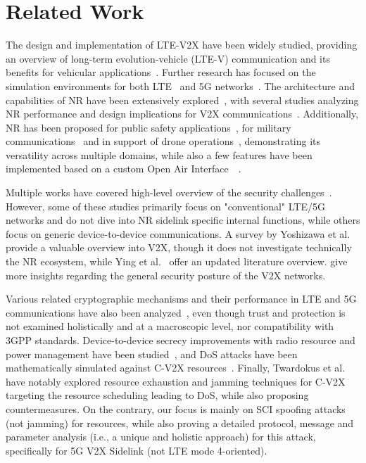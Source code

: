 \section{Related Work}
\label{sec:related-work}

The design and implementation of LTE-V2X have been widely studied, providing an overview of long-term evolution-vehicle (LTE-V) communication and its benefits for vehicular applications~\cite{Molina17LTEVFS, bazzi21V2X, liu15cellular, Chen17v2x, Asadi14survey}. Further research has focused on the simulation environments for both LTE~\cite{Virdis16simu} and 5G networks~\cite{Liu22nr}. The architecture and capabilities of NR have been extensively explored~\cite{Garcia21tutorial}, with several studies analyzing NR performance and design implications for V2X communications~\cite{Bagheri21nr, Todisco21PerformanceAO, Tabassum23nr, Ganesan20v2x, Liu22nr}. Additionally, NR has been proposed for public safety applications~\cite{Chukhno23nr}, for military communications~\cite{Bajracharya23:military} and in support of drone operations~\cite{Mishra22CooperativeCU}, demonstrating its versatility across multiple domains, while also a few features have been implemented based on a custom Open Air Interface~\cite{elkadi23opensource5g}~\cite{oai}.

Multiple works have covered high-level overview of the security challenges~\cite{Lu20secoverview, Huang20advances, Luo20phy, alnasser19challengessolutions, marojevic18requirementsprocedures, Mohan22threats, Boualouache23challenges, GHOSAL20:V2X-Survey, Lai20:Challenges}. However, some of these studies primarily focus on "conventional" LTE/5G networks and do not dive into NR sidelink specific internal functions, while others focus on generic device-to-device communications. A survey by Yoshizawa et al.~\cite{Yoshizawa23v2xsurvey} provide a valuable overview into V2X, though it does not investigate technically the NR ecosystem, while Ying et al.~\cite{Ying24review} offer an updated literature overview. \cite{Sedar23survey, Hasan20v2x} give more insights regarding the general security posture of the V2X networks.

Various related cryptographic mechanisms and their performance in LTE and 5G communications have also been analyzed~\cite{Pizzi21securedelivery, Zhang15SeDS, Suraci21d2d, Ahmed18secure, Liu21plattoning, Alnasser20trust}, even though trust and protection is not examined holistically and at a macroscopic level, nor compatibility with 3GPP standards. Device-to-device secrecy improvements with radio resource and power management have been studied~\cite{Yiliang20secrecy}, and DoS attacks have been mathematically simulated against C-V2X resources~\cite{Trkulja20DenialofServiceAO}. Finally, Twardokus et al.~\cite{Twardokus22dos, Twardokus23dos} have notably explored resource exhaustion and jamming techniques for C-V2X targeting the resource scheduling leading to DoS, while also proposing countermeasures. On the contrary, our focus is mainly on SCI spoofing attacks (not jamming) for resources, while also proving a detailed protocol, message and parameter analysis (i.e., a unique and holistic approach) for this attack, specifically for 5G V2X Sidelink (not LTE mode 4-oriented).

